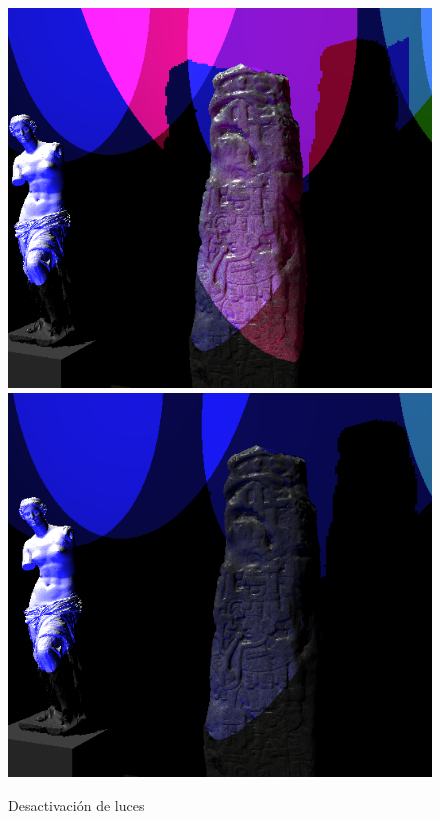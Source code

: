 \documentclass[12pt]{article}
\begin{document}
{\begin{figure}[H]
\centering
\includegraphics[scale=0.5]{images/luzon.png}
\includegraphics[scale=0.5]{images/luzoff.png}
\caption{Desactivación de luces}
\end{figure}

}
\end{document}
